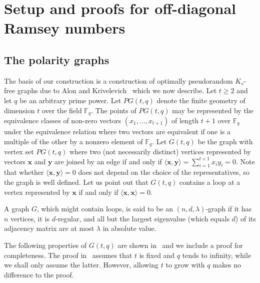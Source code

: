 \documentclass{article}
\theoremstyle{plain}
\theoremstyle{definition}
\newcommand{\bF}{\mathbb{F}}
\newcommand{\bx}{\mathbf{x}}
\newcommand{\by}{\mathbf{y}}
\begin{document}
\section{Setup and proofs for off-diagonal Ramsey numbers} \label{sec:proof}

\subsection{The polarity graphs} \label{subsec:Gtq}
The basis of our construction is a construction of optimally pseudorandom $K_s$-free graphs due to Alon and Krivelevich~\cite{alon-krivelevich} which we now describe. Let $t \ge 2$ and let $q$ be an arbitrary prime power. Let $PG(t, q)$ denote the finite geometry of dimension $t$ over the field $\bF_q$. The points of $PG(t, q)$ may be represented by the equivalence classes of non-zero vectors $(x_1, \dots, x_{t+1})$ of length $t+1$ over $\bF_q$ under the equivalence relation where two vectors are equivalent if one is a multiple of the other by a nonzero element of $\bF_q$. Let $G(t, q)$ be the graph with vertex set $PG(t, q)$ where two (not necessarily distinct) vertices represented by vectors $\bx$ and $\by$ are joined by an edge if and only if $\langle \bx, \by \rangle = \sum_{i=1}^{t+1} x_i y_i = 0$. Note that whether $\langle \bx, \by \rangle = 0$ does not depend on the choice of the representatives, so the graph is well defined. Let us point out that $G(t, q)$ contains a loop at a vertex represented by $\bx$ if and only if $\langle \bx, \bx \rangle = 0$.

A graph $G$, which might contain loops, is said to be an $(n, d, \lambda)$-graph if it has $n$ vertices, it is $d$-regular, and all but the largest eigenvalue (which equals $d$) of its adjacency matrix are at most $\lambda$ in absolute value.

The following properties of $G(t, q)$ are shown in~\cite{alon-krivelevich} and we include a proof for completeness. The proof in~\cite{alon-krivelevich} assumes that $t$ is fixed and $q$ tends to infinity, while we shall only assume the latter. However, allowing $t$ to grow with $q$ makes no difference to the proof.
\end{document}
